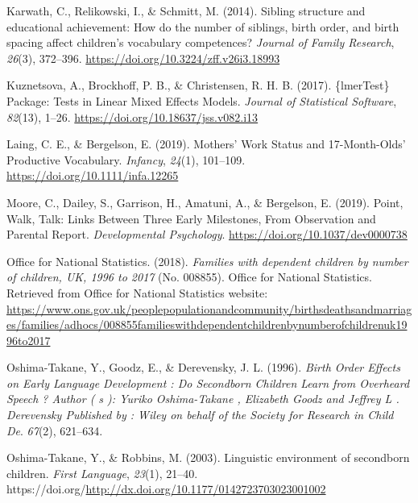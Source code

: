 \documentclass[
  man,mask,floatsintext]{apa6}
\newlength{\cslhangindent}
\newlength{\cslentryspacingunit} %
\newenvironment{CSLReferences}[2] %
 {%
  \setlength{\parindent}{0pt}
  \ifodd #1
  \let\oldpar\par
  \def\par{\hangindent=\cslhangindent\oldpar}
  \fi
  \setlength{\parskip}{#2\cslentryspacingunit}
 }%
 {}
\begin{document}
\begin{CSLReferences}{1}{0}
\leavevmode{}%
Karwath, C., Relikowski, I., \& Schmitt, M. (2014). Sibling structure and educational achievement: How do the number of siblings, birth order, and birth spacing affect children's vocabulary competences? \emph{Journal of Family Research}, \emph{26}(3), 372--396. \url{https://doi.org/10.3224/zff.v26i3.18993}

\leavevmode{}%
Kuznetsova, A., Brockhoff, P. B., \& Christensen, R. H. B. (2017). \{{lmerTest}\} {Package}: {Tests} in {Linear} {Mixed} {Effects} {Models}. \emph{Journal of Statistical Software}, \emph{82}(13), 1--26. \url{https://doi.org/10.18637/jss.v082.i13}

\leavevmode{}%
Laing, C. E., \& Bergelson, E. (2019). Mothers' {Work} {Status} and 17-{Month}-{Olds}' {Productive} {Vocabulary}. \emph{Infancy}, \emph{24}(1), 101--109. \url{https://doi.org/10.1111/infa.12265}

\leavevmode{}%
Moore, C., Dailey, S., Garrison, H., Amatuni, A., \& Bergelson, E. (2019). Point, {Walk}, {Talk}: {Links} {Between} {Three} {Early} {Milestones}, {From} {Observation} and {Parental} {Report}. \emph{Developmental Psychology}. \url{https://doi.org/10.1037/dev0000738}

\leavevmode{}%
Office for National Statistics. (2018). \emph{Families with dependent children by number of children, {UK}, 1996 to 2017} (No. 008855). Office for National Statistics. Retrieved from Office for National Statistics website: \url{https://www.ons.gov.uk/peoplepopulationandcommunity/birthsdeathsandmarriages/families/adhocs/008855familieswithdependentchildrenbynumberofchildrenuk1996to2017}

\leavevmode{}%
Oshima-Takane, Y., Goodz, E., \& Derevensky, J. L. (1996). \emph{Birth {Order} {Effects} on {Early} {Language} {Development} : {Do} {Secondborn} {Children} {Learn} from {Overheard} {Speech} ? {Author} ( s ): {Yuriko} {Oshima}-{Takane} , {Elizabeth} {Goodz} and {Jeffrey} {L} . {Derevensky} {Published} by : {Wiley} on behalf of the {Society} for {Research} in {Child} {De}}. \emph{67}(2), 621--634.

\leavevmode{}%
Oshima-Takane, Y., \& Robbins, M. (2003). Linguistic environment of secondborn children. \emph{First Language}, \emph{23}(1), 21--40. https://doi.org/\url{http://dx.doi.org/10.1177/0142723703023001002}


\end{CSLReferences}
\end{document}
